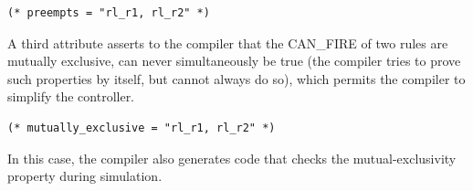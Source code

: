 {\small
\begin{Verbatim}[frame=single,label=BSV]
(* preempts = "rl_r1, rl_r2" *)
\end{Verbatim}
}

A third attribute asserts to the compiler that the CAN\_FIRE of two
rules are mutually exclusive, {\ie} can never simultaneously be true
(the compiler tries to prove such properties by itself, but cannot
always do so), which permits the compiler to simplify the controller.

{\small
\begin{Verbatim}[frame=single,label=BSV]
(* mutually_exclusive = "rl_r1, rl_r2" *)
\end{Verbatim}
}

In this case, the compiler also generates code that checks the
mutual-exclusivity property during simulation.

